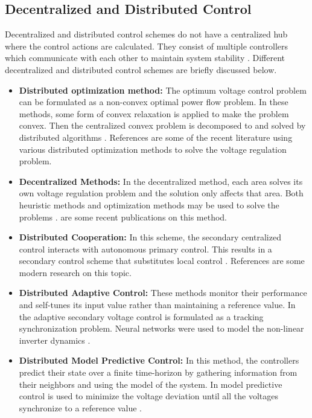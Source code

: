 \subsection{Decentralized and Distributed Control}
Decentralized and distributed control schemes do not have a centralized hub where the control actions are calculated. They consist of multiple controllers which communicate with each other to maintain system stability \cite{DB_VC_1}.  Different decentralized and distributed control schemes are briefly discussed below.

\begin{itemize}
    \item \textbf{Distributed optimization method:} The optimum voltage control problem can be formulated as a non-convex optimal power flow problem. In these methods, some form of convex relaxation is applied to make the problem convex. Then the centralized convex problem is decomposed to and solved by distributed algorithms \cite{Kyrue}. References  \cite{KUt17,BAR16,BAR161,WZh16} are some of the recent literature using various distributed optimization methods to solve the voltage regulation problem.
    \item \textbf{Decentralized Methods:} In the decentralized method, each area solves its own voltage regulation problem and the solution only affects that area. Both heuristic methods and optimization methods may be used to solve the problems \cite{Kyrue}. \cite{MChss,MBa,XZh16,MNa16,LRe15,EDass} are some recent publications on this method.
    \item \textbf{Distributed Cooperation:} In this scheme, the secondary centralized control interacts with autonomous primary control. This results in a secondary control scheme that substitutes local control \cite{Kyrue}. References \cite{ABi13,FGu15,SAn13,QSh14} are some modern research on this topic.
    \item \textbf{Distributed Adaptive Control:} These methods monitor their performance and self-tunes its input value rather than maintaining a reference value. In \cite{ABi14} the adaptive secondary voltage control is formulated as a tracking synchronization problem. Neural networks were used to model the non-linear inverter dynamics \cite{Kyrue}.
    \item \textbf{Distributed Model Predictive Control:} In this method, the controllers predict their state over a finite time-horizon by gathering information from their neighbors and using the model of the system. In \cite{GLoss} model predictive control is used to minimize the voltage deviation until all the voltages synchronize to a reference value \cite{Kyrue}.

\end{itemize}
